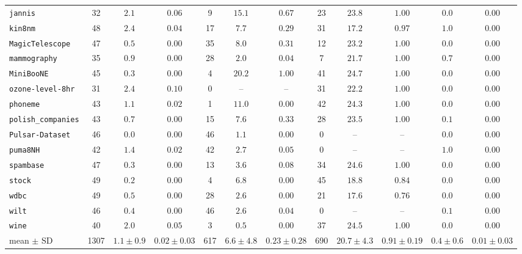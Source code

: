 {\begin{tabular}{@{}lccccccccccc@{}}
\texttt{jannis} & 32 & $2.1$ & $0.06$ & 9 & $15.1$ & $0.67$ & 23 & $23.8$ & $1.00$ & $0.0$ & $0.00$ \\
\texttt{kin8nm} & 48 & $2.4$ & $0.04$ & 17 & $7.7$ & $0.29$ & 31 & $17.2$ & $0.97$ & $1.0$ & $0.00$ \\
\texttt{MagicTelescope} & 47 & $0.5$ & $0.00$ & 35 & $8.0$ & $0.31$ & 12 & $23.2$ & $1.00$ & $0.0$ & $0.00$ \\
\texttt{mammography} & 35 & $0.9$ & $0.00$ & 28 & $2.0$ & $0.04$ & 7 & $21.7$ & $1.00$ & $0.7$ & $0.00$ \\
\texttt{MiniBooNE} & 45 & $0.3$ & $0.00$ & 4 & $20.2$ & $1.00$ & 41 & $24.7$ & $1.00$ & $0.0$ & $0.00$ \\
\texttt{ozone-level-8hr} & 31 & $2.4$ & $0.10$ & 0 & -- & -- & 31 & $22.2$ & $1.00$ & $0.0$ & $0.00$ \\
\texttt{phoneme} & 43 & $1.1$ & $0.02$ & 1 & $11.0$ & $0.00$ & 42 & $24.3$ & $1.00$ & $0.0$ & $0.00$ \\
\texttt{polish\_companies} & 43 & $0.7$ & $0.00$ & 15 & $7.6$ & $0.33$ & 28 & $23.5$ & $1.00$ & $0.1$ & $0.00$ \\
\texttt{Pulsar-Dataset} & 46 & $0.0$ & $0.00$ & 46 & $1.1$ & $0.00$ & 0 & -- & -- & $0.0$ & $0.00$ \\
\texttt{puma8NH} & 42 & $1.4$ & $0.02$ & 42 & $2.7$ & $0.05$ & 0 & -- & -- & $1.0$ & $0.00$ \\
\texttt{spambase} & 47 & $0.3$ & $0.00$ & 13 & $3.6$ & $0.08$ & 34 & $24.6$ & $1.00$ & $0.0$ & $0.00$ \\
\texttt{stock} & 49 & $0.2$ & $0.00$ & 4 & $6.8$ & $0.00$ & 45 & $18.8$ & $0.84$ & $0.0$ & $0.00$ \\
\texttt{wdbc} & 49 & $0.5$ & $0.00$ & 28 & $2.6$ & $0.00$ & 21 & $17.6$ & $0.76$ & $0.0$ & $0.00$ \\
\texttt{wilt} & 46 & $0.4$ & $0.00$ & 46 & $2.6$ & $0.04$ & 0 & -- & -- & $0.1$ & $0.00$ \\
\texttt{wine} & 40 & $2.0$ & $0.05$ & 3 & $0.5$ & $0.00$ & 37 & $24.5$ & $1.00$ & $0.0$ & $0.00$ \\
\midrule mean $\pm$ SD & 1307 & $1.1 \pm 0.9$ & $0.02 \pm 0.03$ & 617 & $6.6 \pm 4.8$ & $0.23 \pm 0.28$ & 690 & $20.7 \pm 4.3$ & $0.91 \pm 0.19$ & $0.4 \pm 0.6$ & $0.01 \pm 0.03$ \\
\bottomrule\end{tabular}}
